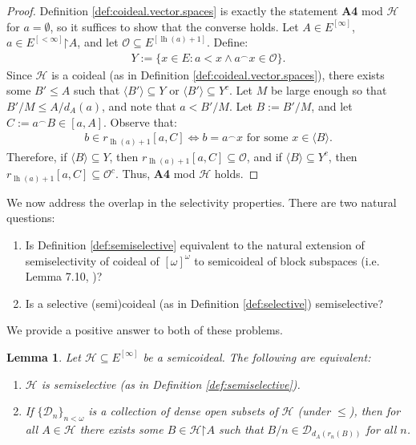 \documentclass[10pt,a4paper]{amsart}
\theoremstyle{plain}
\numberwithin{equation}{section}
\newtheorem{lemma}[theorem]{Lemma}
\theoremstyle{definition}
\newcommand{\func}{\operatorname}
\renewcommand{\c}[1]{\langle #1 \rangle}
\newcommand{\cal}{\mathcal}
\newcommand{\restrictedto}{\mathord{\upharpoonright}}
\renewcommand{\H}{\cal{H}}
\newcommand{\lh}{\func{lh}}
\renewcommand{\O}{\cal{O}}
\newcommand{\D}{\cal{D}}
\begin{document}
\begin{proof}
    Definition \ref{def:coideal.vector.spaces} is exactly the statement \textbf{A4} mod $\H$ for $a = \emptyset$, so it suffices to show that the converse holds. Let $A \in E^{[\infty]}$, $a \in E^{[<\infty]}\restrictedto A$, and let $\O \subseteq E^{[\lh(a)+1]}$. Define:
    \begin{align*}
        Y := \{x \in E : a < x \wedge a^\frown x \in \O\}.
    \end{align*}
    Since $\H$ is a coideal (as in Definition \ref{def:coideal.vector.spaces}), there exists some $B' \leq A$ such that $\c{B'} \subseteq Y$ or $\c{B'} \subseteq Y^c$. Let $M$ be large enough so that $B'/M \leq A/d_A(a)$, and note that $a < B'/M$. Let $B := B'/M$, and let $C := a^\frown B \in [a,A]$. Observe that:
    \begin{align*}
        b \in r_{\lh(a)+1}[a,C] \iff b = a^\frown x \text{ for some $x \in \c{B}$}.
    \end{align*}
    Therefore, if $\c{B} \subseteq Y$, then $r_{\lh(a)+1}[a,C] \subseteq \O$, and if $\c{B} \subseteq Y^c$, then $r_{\lh(a)+1}[a,C] \subseteq \O^c$. Thus, \textbf{A4} mod $\H$ holds.
\end{proof}

We now address the overlap in the selectivity properties. There are two natural questions:
\begin{enumerate}
    \item Is Definition \ref{def:semiselective} equivalent to the natural extension of semiselectivity of coideal of $[\omega]^\omega$ to semicoideal of block subspaces (i.e. Lemma 7.10, \cite{T10})?

    \item Is a selective (semi)coideal (as in Definition \ref{def:selective}) semiselective?
\end{enumerate}

We provide a positive answer to both of these problems.

\begin{lemma}
\label{lem:semiselectivity.equivalence}
    Let $\H \subseteq E^{[\infty]}$ be a semicoideal. The following are equivalent:
    \begin{enumerate}
        \item $\H$ is semiselective (as in Definition \ref{def:semiselective}).
        
        \item If $\{\D_n\}_{n<\omega}$ is a collection of dense open subsets of $\H$ (under $\leq$), then for all $A \in \H$ there exists some $B \in \H\restrictedto A$ such that $B/n \in \D_{d_A(r_n(B))}$ for all $n$.
    \end{enumerate}
\end{lemma}
\end{document}
